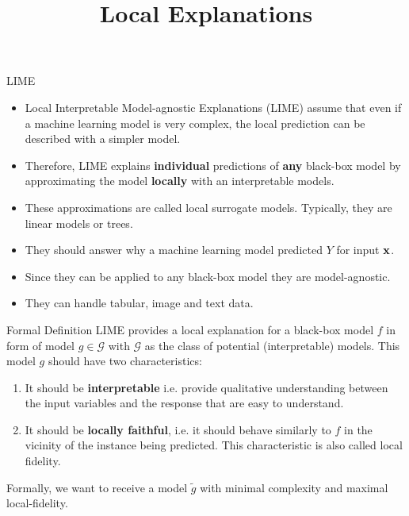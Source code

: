\documentclass[11pt,compress,t,notes=noshow, xcolor=table]{beamer}
\title{Local Explanations}
\institute{\href{https://compstat-lmu.github.io/lecture_i2ml/}{compstat-lmu.github.io/lecture\_i2ml}}
\date{}
\newcommand{\Gspace}{\mathcal{G}}
\begin{document}
	
	
	
	
	
	
	
	
	

\begin{vbframe}{LIME}
\begin{itemize}
		\item Local Interpretable Model-agnostic Explanations (LIME) assume that even if a machine learning model is very complex, the local prediction can be described with a simpler model.
		\item  Therefore, LIME explains \textbf{individual} predictions of \textbf{any} black-box model by approximating the model \textbf{locally} with an interpretable models.
		\item These approximations are called local surrogate models. Typically, they are linear models or trees.
		\item They should answer why a machine learning model predicted $Y$ for input $\xv$.
		\item Since they can be applied to any black-box model they are model-agnostic.  
		\item They can handle tabular, image and text data. 
\end{itemize}
\end{vbframe}

\begin{vbframe}{Formal Definition}
	LIME provides a local explanation for a black-box model $f$ in form of model $g \in \Gspace$ with $\Gspace$ as the class of potential (interpretable) models. This model $g$ should have two characteristics:
	\begin{enumerate}
		\item It should be \textbf{interpretable} i.e. provide qualitative understanding between the input variables and the response that are easy to understand.  
		\item It should be \textbf{locally faithful}, i.e. it should behave similarly to $f$ in the vicinity of the instance being predicted. This characteristic is also called local fidelity. 
	\end{enumerate}
	Formally, we want to receive a model $\tilde{g}$ with minimal complexity and maximal local-fidelity. 
\end{vbframe}
\end{document}
